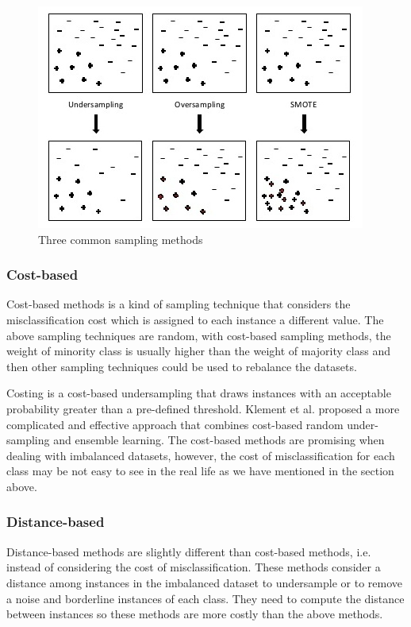 \begin{figure}[!ht]
\centering
\caption{Three common sampling methods \citep{dal2013racing}}
\label{sampling_methods}
\includegraphics[]{Images/sampling_methods.jpg} 
\end{figure}


\subsubsection*{Cost-based}
\label{cost_based}

Cost-based methods is a kind of sampling technique that considers the misclassification cost which is assigned to each instance a different value. The above sampling techniques are random, with cost-based sampling methods, the weight of minority class is usually higher than the weight of majority class and then other sampling techniques could be used to rebalance the datasets.

Costing \citep{zadrozny2003cost} is a cost-based undersampling that draws instances with an acceptable probability greater than a pre-defined threshold. Klement et al. \citep{klement2009cost} proposed a more complicated and effective approach that combines cost-based random under-sampling and ensemble learning. The cost-based methods are promising when dealing with imbalanced datasets, however, the cost of misclassification for each class may be not easy to see in the real life as we have mentioned in the section above.
 

\subsubsection*{Distance-based}
\label{distance_based}

Distance-based methods are slightly different than cost-based methods, i.e. instead of considering the cost of misclassification. These methods consider a distance among instances in the imbalanced dataset to undersample or to remove a noise and borderline instances of each class. They need to compute the distance between instances so these methods are more costly than the above methods.

